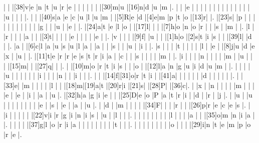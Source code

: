 \documentclass[12pt]{article}
\begin{document}
\begin{Puzzle}{22}{24}
  |{}  |{}  |[38]v|e   |n   |t   |u   |r   |e   |{}  |{}  |{}  |{}  |{}  |{}  |[30]m|u   |[16]n|d   |u   |m   |.
  |{}  |{}  |e   |{}  |{}  |{}  |{}  |{}  |{}  |{}  |{}  |{}  |{}  |{}  |{}  |{}  |{}  |u   |{}  |{}  |{}  |.
  |{}  |{}  |[40]s|a   |e   |c   |u   |l   |u   |m   |{}  |[5]R|e   |d   |[4]e|m   |p   |t   |o   |[13]r|{}  |.
  |[23]s|{}  |p   |{}  |{}  |{}  |{}  |{}  |{}  |{}  |{}  |{}  |{}  |{}  |g   |{}  |{}  |u   |{}  |e   |{}  |.
  |[24]a|t   |e   |l   |o   |{}  |[17]l|{}  |{}  |{}  |[7]h|o   |n   |o   |r   |{}  |{}  |s   |{}  |m   |{}  |.
  |l   |{}  |r   |{}  |{}  |{}  |a   |{}  |{}  |[3]t|{}  |{}  |{}  |{}  |e   |{}  |{}  |{}  |{}  |e   |{}  |.
  |v   |{}  |{}  |{}  |[9]f|{}  |u   |{}  |{}  |[1]h|o   |[2]s|t   |i   |s   |{}  |{}  |[39]l|{}  |d   |{}  |.
  |a   |{}  |[6]c|l   |a   |u   |s   |u   |l   |a   |{}  |a   |{}  |{}  |s   |{}  |{}  |u   |{}  |i   |{}  |.
  |s   |{}  |{}  |{}  |t   |{}  |{}  |{}  |{}  |l   |{}  |e   |{}  |[8]j|u   |d   |e   |x   |{}  |u   |{}  |.
  |[11]t|e   |r   |r   |e   |s   |t   |r   |i   |a   |{}  |c   |{}  |{}  |s   |{}  |{}  |{}  |{}  |m   |{}  |.
  |i   |{}  |{}  |{}  |n   |{}  |{}  |{}  |{}  |m   |{}  |u   |{}  |{}  |{}  |[15]m|{}  |{}  |[27]q|{}  |{}  |.
  |{}  |[10]m|o   |r   |t   |i   |s   |{}  |{}  |o   |{}  |[12]l|a   |n   |g   |u   |i   |d   |u   |m   |{}  |.
  |{}  |{}  |{}  |{}  |u   |{}  |{}  |{}  |{}  |{}  |{}  |i   |{}  |{}  |{}  |n   |{}  |{}  |i   |{}  |{}  |.
  |{}  |{}  |[14]f|[31]o|r   |t   |i   |{}  |[41]a|{}  |{}  |{}  |{}  |{}  |{}  |d   |{}  |{}  |{}  |{}  |{}  |.
  |{}  |[33]e|{}  |m   |{}  |{}  |{}  |{}  |l   |{}  |{}  |[18]m|[19]a|t   |[20]r|i   |[21]s|{}  |[28]P|{}  |[36]c|.
  |{}  |x   |{}  |n   |{}  |{}  |{}  |{}  |m   |{}  |{}  |{}  |e   |{}  |e   |{}  |i   |{}  |a   |{}  |u   |.
  |[32]h|a   |g   |i   |e   |{}  |{}  |[25]D|e   |o   |P   |a   |t   |r   |i   |{}  |d   |{}  |r   |{}  |j   |.
  |{}  |u   |{}  |u   |{}  |{}  |{}  |{}  |{}  |{}  |{}  |{}  |e   |{}  |s   |{}  |e   |{}  |a   |{}  |u   |.
  |{}  |d   |{}  |m   |{}  |{}  |{}  |{}  |[34]F|{}  |{}  |{}  |r   |{}  |{}  |[26]p|r   |e   |c   |e   |s   |.
  |{}  |i   |{}  |{}  |{}  |{}  |{}  |[22]v|i   |r   |g   |i   |n   |i   |s   |{}  |u   |{}  |l   |{}  |{}  |.
  |{}  |{}  |{}  |{}  |{}  |{}  |{}  |{}  |l   |{}  |{}  |{}  |a   |{}  |{}  |[35]o|m   |n   |i   |a   |{}  |.
  |{}  |{}  |{}  |{}  |[37]g|l   |o   |r   |i   |a   |{}  |{}  |{}  |{}  |{}  |{}  |{}  |{}  |t   |{}  |{}  |.
  |{}  |{}  |{}  |{}  |{}  |{}  |{}  |{}  |o   |{}  |{}  |{}  |[29]i|n   |t   |e   |m   |p   |o   |r   |e   |.
\end{Puzzle}
\end{document}
